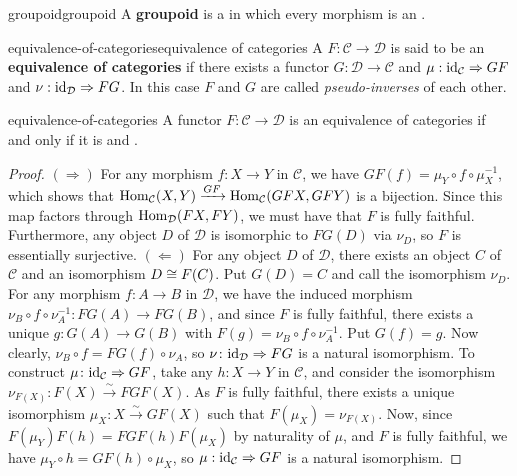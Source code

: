 \begin{topic}{groupoid}{groupoid}
    A \textbf{groupoid} is a  in which every morphism is an .
\end{topic}

\begin{topic}{equivalence-of-categories}{equivalence of categories}
    A  $F \colon \mathcal{C} \to \mathcal{D}$ is said to be an \textbf{equivalence of categories} if there exists a functor $G \colon \mathcal{D} \to \mathcal{C}$ and  $\mu : \textup{id}_\mathcal{C} \Rightarrow GF$ and $\nu : \textup{id}_\mathcal{D} \Rightarrow FG$. In this case $F$ and $G$ are called \textit{pseudo-inverses} of each other.
\end{topic}

\begin{example}{equivalence-of-categories}
    A functor $F \colon \mathcal{C} \to \mathcal{D}$ is an equivalence of categories if and only if it is   and .
    \begin{proof}
        $(\Rightarrow)$ For any morphism $f \colon X \to Y$ in $\mathcal{C}$, we have $GF(f) = \mu_Y \circ f \circ \mu_X^{-1}$, which shows that $\operatorname{Hom}_\mathcal{C}(X, Y) \xrightarrow{GF} \operatorname{Hom}_\mathcal{C}(GFX, GFY)$ is a bijection. Since this map factors through $\operatorname{Hom}_\mathcal{D}(FX, FY)$, we must have that $F$ is fully faithful. Furthermore, any object $D$ of $\mathcal{D}$ is isomorphic to $FG(D)$ via $\nu_D$, so $F$ is essentially surjective.
        $(\Leftarrow)$ For any object $D$ of $\mathcal{D}$, there exists an object $C$ of $\mathcal{C}$ and an isomorphism $D \cong F(C)$. Put $G(D) = C$ and call the isomorphism $\nu_D$. For any morphism $f \colon A \to B$ in $\mathcal{D}$, we have the induced morphism $\nu_B \circ f \circ \nu_A^{-1} \colon FG(A) \to FG(B)$, and since $F$ is fully faithful, there exists a unique $g \colon G(A) \to G(B)$ with $F(g) = \nu_B \circ f \circ \nu_A^{-1}$. Put $G(f) = g$. Now clearly, $\nu_B \circ f = FG(f) \circ \nu_A$, so $\nu \colon \textup{id}_\mathcal{D} \Rightarrow FG$ is a natural isomorphism. To construct $\mu \colon \textup{id}_\mathcal{C} \Rightarrow GF$, take any $h \colon X \to Y$ in $\mathcal{C}$, and consider the isomorphism $\nu_{F(X)} : F(X) \xrightarrow{\sim} FGF(X)$. As $F$ is fully faithful, there exists a unique isomorphism $\mu_X : X \xrightarrow{\sim} GF(X)$ such that $F(\mu_X) = \nu_{F(X)}$. Now, since $F(\mu_Y) F(h) = FGF(h) F(\mu_X)$ by naturality of $\mu$, and $F$ is fully faithful, we have $\mu_Y \circ h = GF(h) \circ \mu_X$, so $\mu : \textup{id}_\mathcal{C} \Rightarrow GF$ is a natural isomorphism.
    \end{proof}
\end{example}

